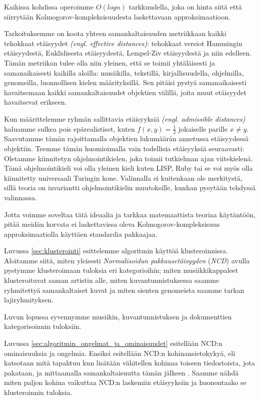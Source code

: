 \documentclass[12pt,finnish]{tktltiki2}
\theoremstyle{definition}
\theoremstyle{remark}
\newcommand{\engl}[1]{\emph{(engl. #1)}}
\begin{document}
  Kaikissa kohdissa  operoimme $O(log n)$ tarkkuudella, joka on hinta siitä että siirrytään Kolmogorov-kompleksisuudesta laskettavaan approksimaatioon.

  Tarkoituksemme on koota yhteen samankaltaisuuden metriikkaan kaikki tehokkaat etäisyydet \engl{effective distances}: tehokkaat versiot Hammingin etäisyydestä, Euklidisesta etäisyydestä, Lempel-Ziv etäisyydestä ja niin edelleen.
  Tämän metriikan tulee olla niin yleinen, että se toimii yhtäläisesti ja samanaikaisesti kaikilla aloilla: musiikilla, tekstillä, kirjallisuudella, ohjelmilla, genomeilla, luonnollisen kielen määrityksillä.
  Sen pitäisi pystyä samanaikaisesti havaitsemaan kaikki samankaltaisuudet objektien välillä, joita muut etäisyydet havaitsevat erikseen.

  Kun määrittelemme ryhmän sallittavia etäisyyksiä \engl{admissible distances} haluamme sulkea pois epärealistiset, kuten $f(x,y) = \frac{1}{2}$ jokaiselle parille $x \neq y$.
  Saavutamme tämän rajoittamalla objektien lukumäärän annetussa etäisyydessä objektiin.
  Teemme tämän huomioimalla vain todellisia etäisyyksiä seuraavasti: Oletamme kiinnitetyn ohjelmointikielen, joka toimii tutkielman ajan viitekielenä.
  Tämä ohjelmointikieli voi olla yleinen kieli kuten LISP, Ruby tai se voi myös olla kiinnitetty universaali Turingin kone. \cite{CV05,cilibrasi2007google}
  Valinnalla ei kuitenkaan ole merkitystä, sillä teoria on invariantti ohjelmointikielin muutoksille, kunhan pysytään tehdyssä valinnassa.


Jotta voimme soveltaa tätä ideaalia ja tarkkaa matemaattista teoriaa käytäntöön, pitää meidän korvata ei laskettavissa oleva Kolmogorov-kompleksisuus approksimaatiolla käyttäen standardia pakkaajaa.

\label{par:intro-3}
  Luvussa \ref{sec:klusterointi} esittelemme algoritmin käyttöä klusteroinnissa.
  Aloitamme siitä, miten yleisesti \emph{Normalisoidun pakkausetäisyyden} (\emph{NCD}) avulla pystymme klusteroimaan tuloksia eri kategorioihin; miten musiikkikappaleet klusteroituvat saman artistin alle, miten kuvantunnistuksessa saamme ryhmitettyä samankaltaiset kuvat ja miten sienten genomeista saamme tarkan lajiryhmityksen.


  Luvun lopussa syvennymme musiikin, kuvantunnistuksen ja dokumenttien kategorisoinnin tuloksiin.


\label{par:intro-4}
  Luvussa \ref{sec:algoritmin_ongelmat_ja_ominaisuudet} esitellään NCD:n ominaisuuksia ja ongelmia.
  Ensiksi esitellään NCD:n kohinansietokykyä, eli katsotaan mitä tapahtuu kun lisätään vähitellen kohinaa toiseen tiedostoista, jota pakataan, ja mittaamalla samankaltaisuutta tämän jälkeen \cite{4167725}.
  Saamme nähdä miten paljon kohina vaikuttaa NCD:n laskemiin etäisyyksiin ja huonontaako se klusteroinnin tuloksia.
\end{document}
